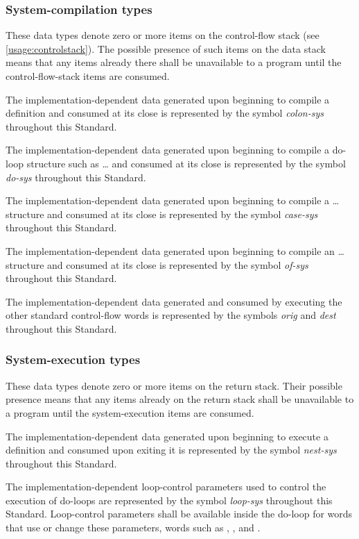 \subsubsection{System-compilation types} %

These data types denote zero or more items on the control-flow stack
(see \ref{usage:controlstack}). The possible presence of such items
on the data stack means that any items already there shall be
unavailable to a program until the control-flow-stack items are
consumed.

The implementation-dependent data generated upon beginning to compile
a definition and consumed at its close is represented by the symbol
\emph{colon-sys} throughout this Standard.

The implementation-dependent data generated upon beginning to
compile a do-loop structure such as  {\ldots} 
and consumed at its close is represented by the symbol \emph{do-sys}
throughout this Standard.

The implementation-dependent data generated upon beginning to
compile a  {\ldots}  structure and consumed
at its close is represented by the symbol \emph{case-sys} throughout
this Standard.

The implementation-dependent data generated upon beginning to
compile an  {\ldots}  structure and consumed
at its close is represented by the symbol \emph{of-sys} throughout
this Standard.

The implementation-dependent data generated and consumed by executing
the other standard control-flow words is represented by the symbols
\emph{orig} and \emph{dest} throughout this Standard.

\subsubsection{System-execution types} %

These data types denote zero or more items on the return stack.
Their possible presence means that any items already on the return
stack shall be unavailable to a program until the system-execution
items are consumed.

The implementation-dependent data generated upon beginning to
execute a definition and consumed upon exiting it is represented
by the symbol \emph{nest-sys} throughout this Standard.

The implementation-dependent loop-control parameters used to
control the execution of do-loops are represented by the symbol
\emph{loop-sys} throughout this Standard. Loop-control parameters
shall be available inside the do-loop for words that use or change
these parameters, words such as , , 
and .


